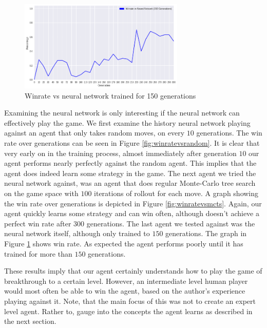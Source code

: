 \begin{figure}
    \begin{small}
        \begin{center}
            \includegraphics[width=0.7\textwidth]{graphics/winratevsneuralnetwork.png}
        \end{center}
        \caption{Winrate vs neural network trained for 150 generations}
        \label{fig:winratevsneuralnetwork}
    \end{small}
\end{figure}

Examining the neural network is only interesting if the neural network can effectively play the game. We first examine the history neural network playing against an agent that only takes random moves, on every $10$ generations. The win rate over generations can be seen in Figure \ref{fig:winratevsrandom}. It is clear that very early on in the training process, almost immediately after generation $10$ our agent performs nearly perfectly against the random agent. This implies that the agent does indeed learn some strategy in the game. The next agent we tried the neural network against, was an agent that does regular Monte-Carlo tree search on the game space with $100$ iterations of rollout for each move. A graph showing the win rate over generations is depicted in Figure \ref{fig:winratevsmcts}. Again, our agent quickly learns some strategy and can win often, although doesn't achieve a perfect win rate after $300$ generations. The last agent we tested against was the neural network itself, although only trained to $150$ generations. The graph in Figure \ref{fig:winratevsneuralnetwork} shows win rate. As expected the agent performs poorly until it has trained for more than $150$ generations.

These results imply that our agent certainly understands how to play the game of breakthrough to a certain level. However, an intermediate level human player would most often be able to win the agent, based on the author's experience playing against it. Note, that the main focus of this was not to create an expert level agent. Rather to, gauge into the concepts the agent learns as described in the next section.


